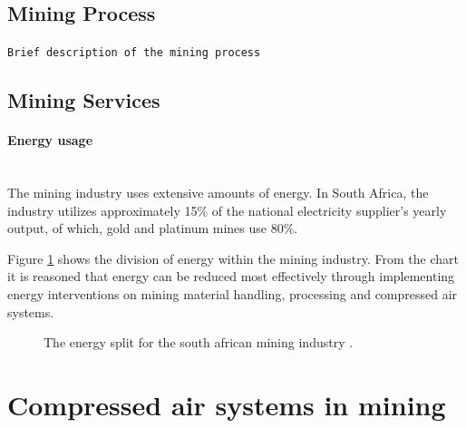 	\subsection{Mining Process}
		\texttt{Brief description of the mining process}
	\subsection{Mining Services}

		\paragraph{Energy usage}\leavevmode\\
			The mining industry uses extensive amounts of energy. In South Africa, the industry utilizes approximately 15\% of the national electricity supplier's yearly output, of which, gold and platinum mines use 80\%.\cite{Eskom2010Energy}
			\par
			Figure \ref{fig: Energy Split} shows the division of energy within the mining industry. From the chart it is reasoned that energy can be reduced most effectively through implementing energy interventions on mining material handling, processing and compressed air systems.
			\begin{figure}[h]
				\centering
				\caption[The energy split for the south african mining industry.]{The energy split for the south african mining industry \cite{Eskom2010Energy}.}
				\label{fig: Energy Split}
			\end{figure}
\section{Compressed air systems in mining}
